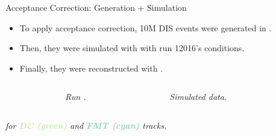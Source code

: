\begin{frame}{Acceptance Correction: Generation + Simulation}
    \label{11.51::introduction}
    \begin{itemize}
        \item
            To apply acceptance correction, 10M DIS events were generated in .

        \item
            Then, they were simulated with  with run 12016's conditions.

        \item
            Finally, they were reconstructed with .
    \end{itemize}

    \vspace{-12pt}

    \begin{columns}[onlytextwidth,T]

    \begin{column}{.05\linewidth}\end{column} %

    \begin{column}{.35\linewidth}
        \begin{center}
            \begin{figure}[t]
                \scriptsize{\textit{Run .}}
            \end{figure}
        \end{center}
    \end{column}

    \begin{column}{.35\linewidth}
        \begin{center}
            \begin{figure}[t]
                \scriptsize{\textit{Simulated data.}}
            \end{figure}
        \end{center}
    \end{column}

    \begin{column}{.05\linewidth}\end{column} %

    \end{columns}

    \begin{center}
        \scriptsize{\textit{
             for \textbf{\textcolor[HTML]{c7eca6}{DC (green)}} and \textbf{\textcolor[HTML]{8dcfbf}{FMT (cyan)}} tracks.
        }}
    \end{center}
\end{frame}

